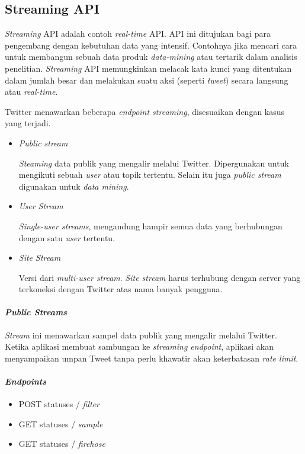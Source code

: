 \subsection{Streaming API}
\textit{Streaming} API adalah contoh \textit{real-time} API. API ini ditujukan bagi para pengembang dengan kebutuhan data yang intensif. Contohnya jika mencari cara untuk membangun sebuah data produk \textit{data-mining} atau tertarik dalam analisis penelitian. \textit{Streaming} API memungkinkan melacak kata kunci yang ditentukan dalam jumlah besar dan melakukan suatu aksi (seperti \textit{tweet}) secara langsung atau \textit{real-time}.

Twitter menawarkan beberapa \textit{endpoint streaming}, disesuaikan dengan kasus yang terjadi. 
\begin{itemize}
	\item \textit{Public stream}
	
	\textit{Steaming} data publik yang mengalir melalui Twitter. Dipergunakan untuk mengikuti sebuah \textit{user} atau topik tertentu. Selain itu juga \textit{public stream} digunakan untuk \textit{data mining}.
	\item \textit{User Stream}
	
	\textit{Single-user streams}, mengandung hampir semua data yang berhubungan dengan satu \textit{user} tertentu.
	
	\item \textit{Site Stream}
	
	Versi dari \textit{multi-user stream}. \textit{Site stream} harus terhubung dengan server yang terkoneksi dengan Twitter atas nama banyak pengguna.
\end{itemize}


\paragraph{\textit{Public Streams}}
\textit{Stream} ini menawarkan sampel data publik yang mengalir melalui Twitter. Ketika aplikasi membuat sambungan ke \textit{streaming endpoint}, aplikasi akan menyampaikan umpan Tweet tanpa perlu khawatir akan keterbatasan \textit{rate limit}.

\paragraph{\textit{Endpoints}}
\begin{itemize}
	\item POST statuses / \textit{filter}
	\item GET statuses / \textit{sample}
	\item GET statuses / \textit{firehose}
\end{itemize}

